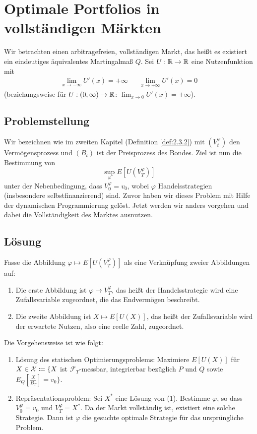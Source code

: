\documentclass[a4paper,twoside,DIV15,BCOR12mm]{scrbook}
\newcommand{\cX}{\mathcal X}
\newcommand{\cF}{\mathcal F}
\begin{document}
\section{Optimale Portfolios in vollständigen Märkten}

Wir betrachten einen arbitragefreien, vollständigen Markt, das heißt es existiert ein eindeutiges äquivalentes Martingalmaß $Q$. Sei $U:\mathbb{R}\to\mathbb{R}$ eine Nutzenfunktion mit
\begin{align*}
\lim_{x\to-\infty} U'(x) = + \infty && \lim_{x\to+\infty} U'(x) = 0
\end{align*}
(beziehungsweise für $U:(0,\infty)\to\mathbb{R}$: $\lim_{x\to0}U'(x) = +\infty$).

\subsection{Problemstellung}

Wir bezeichnen wie im zweiten Kapitel (Definition \ref{def:2.3.2}) mit 
$(V_t^\varphi)$ den Vermögensprozess und $(B_t)$ ist der Preisprozess des Bondes. Ziel ist nun die Bestimmung von
\[
\sup_{\varphi} E[U(V_T^\varphi)]
\]
unter der Nebenbedingung, dass $V_0^\varphi=v_0$, wobei $\varphi$ Handelsstrategien (insbesondere selbstfinanzierend) sind. Zuvor haben wir dieses Problem mit Hilfe der dynamischen Programmierung gelöst. Jetzt werden wir anders vorgehen und dabei die Vollständigkeit des Marktes ausnutzen.

\subsection{Lösung}

Fasse die Abbildung  $\varphi \mapsto E[U(V_T^\varphi)]$ als eine Verknüpfung zweier Abbildungen auf:
\begin{enumerate}
\item Die erste Abbildung ist $\varphi \mapsto V_T^\varphi$, das heißt der Handelsstrategie wird eine Zufallsvariable zugeordnet, die das Endvermögen beschreibt.
\item Die zweite Abbildung ist $X\mapsto E[U(X)]$, das heißt der Zufallsvariable wird der erwartete Nutzen, also eine reelle Zahl, zugeordnet.
\end{enumerate}

Die Vorgehensweise ist wie folgt:
\begin{enumerate}
\item Lösung des statischen Optimierungsproblems: Maximiere $E[U(X)]$ für $X\in\cX \da \{X$ ist $\cF_T$-messbar, integrierbar bezüglich $P$ und $Q$ sowie $E_Q[\frac{X}{B_T}] = v_0\}$.
\item Repräsentationsproblem: Sei $X^*$ eine Lösung von (1). Bestimme $\varphi$, so dass $V_0^\varphi = v_0$ und $V_T^\varphi = X^*$. Da der Markt vollständig ist, existiert eine solche Strategie. Dann ist $\varphi$ die gesuchte optimale Strategie für das ursprüngliche Problem.
\end{enumerate}
\end{document}
